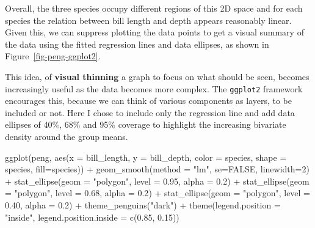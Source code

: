 \documentclass[
  letterpaper,
  10pt,
  krantz2]{krantz}
\makeatletter
\newenvironment{Shaded}{\begin{snugshade}}{\end{snugshade}}
\newcommand{\AttributeTok}[1]{\textcolor[rgb]{0.40,0.45,0.13}{#1}}
\newcommand{\ConstantTok}[1]{\textcolor[rgb]{0.56,0.35,0.01}{#1}}
\newcommand{\DecValTok}[1]{\textcolor[rgb]{0.68,0.00,0.00}{#1}}
\newcommand{\FloatTok}[1]{\textcolor[rgb]{0.68,0.00,0.00}{#1}}
\newcommand{\FunctionTok}[1]{\textcolor[rgb]{0.28,0.35,0.67}{#1}}
\newcommand{\NormalTok}[1]{\textcolor[rgb]{0.00,0.23,0.31}{#1}}
\newcommand{\SpecialCharTok}[1]{\textcolor[rgb]{0.37,0.37,0.37}{#1}}
\newcommand{\StringTok}[1]{\textcolor[rgb]{0.13,0.47,0.30}{#1}}
\newenvironment{kframe}{%
  \medskip{}
  \setlength{\fboxsep}{.8em}
  \def\at@end@of@kframe{}%
  \ifinner\ifhmode%
  \def\at@end@of@kframe{\end{minipage}}%
  \begin{minipage}{\columnwidth}%
  \fi\fi%
  \def\FrameCommand##1{\hskip\@totalleftmargin \hskip-\fboxsep
  \colorbox{shadecolor}{##1}\hskip-\fboxsep
      \hskip-\linewidth \hskip-\@totalleftmargin \hskip\columnwidth}%
  \MakeFramed {\advance\hsize-\width
    \@totalleftmargin\z@ \linewidth\hsize
    \@setminipage}}%
{\par\unskip\endMakeFramed%
  \at@end@of@kframe}
\renewenvironment{Shaded}{\begin{kframe}}{\end{kframe}}
\makeatother
\begin{document}
Overall, the three species occupy different regions of this 2D space and
for each species the relation between bill length and depth appears
reasonably linear. Given this, we can suppress plotting the data points
to get a visual summary of the data using the fitted regression lines
and data ellipses, as shown in Figure~\ref{fig-peng-ggplot2}.

This idea, of \textbf{visual thinning} a graph to focus on what should
be seen, becomes increasingly useful as the data becomes more complex.
The \texttt{ggplot2} framework encourages this, because we can think of
various components as layers, to be included or not. Here I chose to
include only the regression line and add data ellipses of 40\%, 68\% and
95\% coverage to highlight the increasing bivariate density around the
group means.

\begin{Shaded}
\begin{Highlighting}[]
\FunctionTok{ggplot}\NormalTok{(peng, }
       \FunctionTok{aes}\NormalTok{(}\AttributeTok{x =}\NormalTok{ bill\_length, }\AttributeTok{y =}\NormalTok{ bill\_depth,}
           \AttributeTok{color =}\NormalTok{ species, }\AttributeTok{shape =}\NormalTok{ species, }\AttributeTok{fill=}\NormalTok{species)) }\SpecialCharTok{+}
  \FunctionTok{geom\_smooth}\NormalTok{(}\AttributeTok{method =} \StringTok{"lm"}\NormalTok{,  }\AttributeTok{se=}\ConstantTok{FALSE}\NormalTok{, }\AttributeTok{linewidth=}\DecValTok{2}\NormalTok{) }\SpecialCharTok{+}
  \FunctionTok{stat\_ellipse}\NormalTok{(}\AttributeTok{geom =} \StringTok{"polygon"}\NormalTok{, }\AttributeTok{level =} \FloatTok{0.95}\NormalTok{, }\AttributeTok{alpha =} \FloatTok{0.2}\NormalTok{) }\SpecialCharTok{+}
  \FunctionTok{stat\_ellipse}\NormalTok{(}\AttributeTok{geom =} \StringTok{"polygon"}\NormalTok{, }\AttributeTok{level =} \FloatTok{0.68}\NormalTok{, }\AttributeTok{alpha =} \FloatTok{0.2}\NormalTok{) }\SpecialCharTok{+}
  \FunctionTok{stat\_ellipse}\NormalTok{(}\AttributeTok{geom =} \StringTok{"polygon"}\NormalTok{, }\AttributeTok{level =} \FloatTok{0.40}\NormalTok{, }\AttributeTok{alpha =} \FloatTok{0.2}\NormalTok{) }\SpecialCharTok{+}
  \FunctionTok{theme\_penguins}\NormalTok{(}\StringTok{"dark"}\NormalTok{) }\SpecialCharTok{+}
  \FunctionTok{theme}\NormalTok{(}\AttributeTok{legend.position =} \StringTok{"inside"}\NormalTok{,}
        \AttributeTok{legend.position.inside =} \FunctionTok{c}\NormalTok{(}\FloatTok{0.85}\NormalTok{, }\FloatTok{0.15}\NormalTok{))}
\end{Highlighting}
\end{Shaded}
\end{document}
